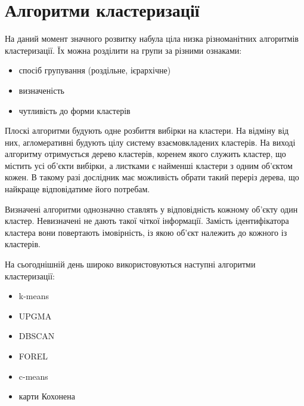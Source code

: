     
    
\section{Алгоритми кластеризації}
    На даний момент значного розвитку набула ціла низка різноманітних алгоритмів кластеризації. Їх можна розділити на групи за різними ознаками:
    \begin{itemize}
        \item спосіб групування (роздільне, ієрархічне)
        \item визначеність 
        \item чутливість до форми кластерів 
    \end{itemize}
    
    Плоскі алгоритми будують одне розбиття вибірки на кластери. На відміну від них, агломеративні будують цілу систему взаємовкладених кластерів. На виході алгоритму отримується дерево кластерів, коренем якого служить кластер, що містить усі об'єкти вибірки, а листками є найменші кластери з одним об'єктом кожен. В такому разі дослідник має можливість обрати такий переріз дерева, що найкраще відповідатиме його потребам.
    
    Визначені алгоритми однозначно ставлять у відповідність кожному об'єкту один кластер. Невизначені не дають такої чіткої інформації. Замість ідентифікатора кластера вони повертають імовірність, із якою об'єкт належить до кожного із кластерів.
    
    На сьогоднішній день широко використовуються наступні алгоритми кластеризації:
    \begin{itemize}
        \item k-means \cite{Steinhaus, MacQueen}
        \item UPGMA \cite{SokalMichener}
        \item DBSCAN \cite{DBSCAN}
        \item FOREL \cite{Zagorujko}
        \item c-means
        \item карти Кохонена \cite{Rosenblatt}
    \end{itemize}
